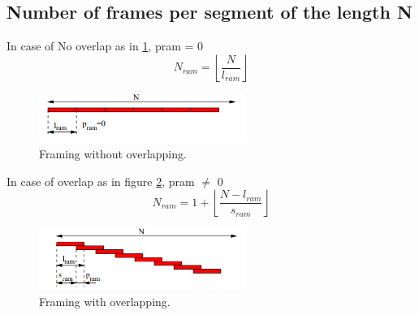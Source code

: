 \documentclass[12pt, a4paper, twoside]{report}
\begin{document}
\subsection{Number of frames per segment of the length N}
In case of No overlap as in \ref{fig:frame-wo-overlap}, pram = 0
\begin{equation}
N_{ram} = \left \lfloor \frac{N}{l_{ram}} \right \rfloor
\end{equation}
\begin{figure}[!h]
	\centering
	\includegraphics[width=0.6\textwidth]
	{images/chapter2/frame-wo-overlap}
	\caption{Framing without overlapping.}
	\label{fig:frame-wo-overlap}
\end{figure}

In case of overlap as in figure \ref{fig:frame-overlap}, pram $\neq$ 0
\begin{equation}
N_{ram} = 1 + \left \lfloor \frac{N - l_{ram}}{s_{ram}} \right \rfloor 
\end{equation}
\begin{figure}[!h]
	\centering
	\includegraphics[width=0.6\textwidth]
	{images/chapter2/frame-overlap}
	\caption{Framing with overlapping.}
	\label{fig:frame-overlap}
\end{figure}
\end{document}
